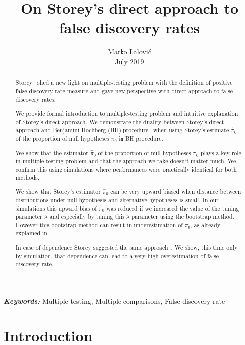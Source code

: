 \documentclass[10pt]{article}
\providecommand{\keywords}[1]{\textbf{\textit{Keywords:}} #1}
\begin{document}
\title{On Storey's direct approach to false discovery rates}
\author{Marko Lalović
\\
July 2019 \\
}

\maketitle

\begin{abstract}
Storey~\cite{Storey} shed a new light on multiple-testing problem with the definition of positive false discovery rate measure and gave new perspective with direct approach to false discovery rates.

We provide formal introduction to multiple-testing problem and intuitive explanation of Storey's direct approach. We demonstrate the duality between Storey's direct approach and Benjamini-Hochberg (BH) procedure~\cite{BH} when using Storey's estimate $\widehat{\pi}_{0}$ of the proportion of null hypotheses $\pi_{0}$ in BH procedure. 

We show that the estimator $\widehat{\pi}_{0}$ of the proportion of null hypotheses $\pi_{0}$ plays a key role in multiple-testing problem and that the approach we take doesn't matter much. We confirm this using simulations where performances were practically identical for both methods.

We show that Storey's estimator $\widehat{\pi}_{0}$ can be very upward biased when distance between distributions under null hypothesis and alternative hypotheses is small. In our simulations this upward bias of $\widehat{\pi}_{0}$ was reduced if we increased the value of the tuning parameter $\lambda$ and especially by tuning this $\lambda$ parameter using the bootstrap method. However this bootstrap method can result in underestimation of $\pi_{0}$, as already explained in~\cite{Black}. 

In case of dependence Storey suggested the same approach~\cite{Dependence}. We show, this time only by simulation, that dependence can lead to a very high overestimation of false discovery rate.
\end{abstract}

\keywords{Multiple testing, Multiple comparisons, False discovery rate}

\tableofcontents

\section{Introduction} \label{sec: intro}
\end{document}
